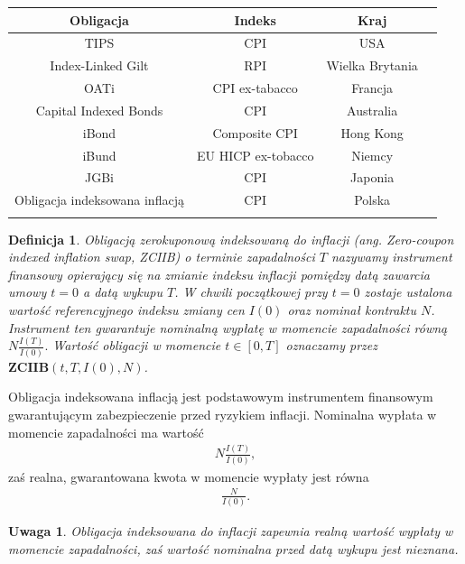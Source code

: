 \documentclass{mini}
\theoremstyle{mythstyle}
\newtheorem{Definicja}{Definicja}[chapter]
\newtheorem{Uwaga}{Uwaga}[chapter]
\begin{document}
	\begin{center}
	\begin{tabular}{c c c c}
		\textbf{Obligacja} & \textbf{Indeks} & \textbf{Kraj}  \\ \hline
		TIPS & CPI & USA  \\
		Index-Linked Gilt  & RPI & Wielka Brytania \\
		OATi & CPI ex-tabacco & Francja   \\
		Capital Indexed Bonds & CPI & Australia   \\
		iBond & Composite CPI& Hong Kong   \\
		iBund & EU HICP ex-tobacco & Niemcy  \\
		JGBi & CPI & Japonia \\
		Obligacja indeksowana inflacją & CPI & Polska\\ \\
   
	\end{tabular}
\end{center}



	\begin{Definicja}
		Obligacją zerokuponową indeksowaną do inflacji (ang. Zero-coupon indexed inflation swap, ZCIIB) o terminie zapadalności $T$ nazywamy instrument finansowy opierający się na zmianie indeksu inflacji pomiędzy datą zawarcia umowy $t = 0$ a datą wykupu $T$. W chwili początkowej przy $t = 0$  zostaje ustalona wartość referencyjnego indeksu zmiany cen $I(0)$ oraz nominał kontraktu $N$. Instrument ten gwarantuje nominalną wypłatę w momencie zapadalności równą $N\frac{I(T)}{I(0)}.$ Wartość obligacji w momencie $t \in [0,T]$ oznaczamy przez $\mathbf{ZCIIB}(t,T,I(0),N)$.
	\end{Definicja}

	Obligacja indeksowana inflacją jest podstawowym instrumentem finansowym gwarantującym zabezpieczenie przed ryzykiem inflacji. Nominalna wypłata w momencie zapadalności ma wartość
	\begin{eqnarray}
		N\frac{I(T)}{I(0)},
	\end{eqnarray}
	zaś realna, gwarantowana kwota w momencie wypłaty jest równa
	\begin{eqnarray}
		 \frac{N}{I(0)}.
	 \end{eqnarray}
 
	 \begin{Uwaga}
		 Obligacja indeksowana do inflacji zapewnia realną wartość wypłaty w momencie zapadalności, zaś wartość nominalna przed datą wykupu jest nieznana.
	 \end{Uwaga}
		
\end{document}
